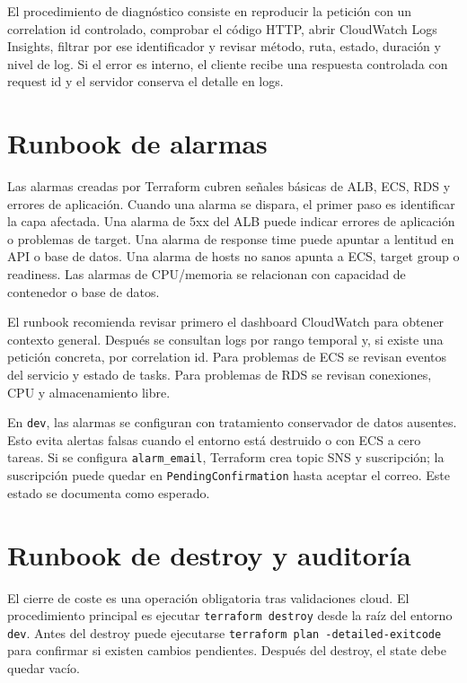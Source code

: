 El procedimiento de diagnóstico consiste en reproducir la petición con un correlation id controlado, comprobar el código HTTP, abrir CloudWatch Logs Insights, filtrar por ese identificador y revisar método, ruta, estado, duración y nivel de log. Si el error es interno, el cliente recibe una respuesta controlada con request id y el servidor conserva el detalle en logs.

\section{Runbook de alarmas}
\label{sec:runbook-alarmas}

Las alarmas creadas por Terraform cubren señales básicas de ALB, ECS, RDS y errores de aplicación. Cuando una alarma se dispara, el primer paso es identificar la capa afectada. Una alarma de 5xx del ALB puede indicar errores de aplicación o problemas de target. Una alarma de response time puede apuntar a lentitud en API o base de datos. Una alarma de hosts no sanos apunta a ECS, target group o readiness. Las alarmas de CPU/memoria se relacionan con capacidad de contenedor o base de datos.

El runbook recomienda revisar primero el dashboard CloudWatch para obtener contexto general. Después se consultan logs por rango temporal y, si existe una petición concreta, por correlation id. Para problemas de ECS se revisan eventos del servicio y estado de tasks. Para problemas de RDS se revisan conexiones, CPU y almacenamiento libre.

En \texttt{dev}, las alarmas se configuran con tratamiento conservador de datos ausentes. Esto evita alertas falsas cuando el entorno está destruido o con ECS a cero tareas. Si se configura \texttt{alarm\_email}, Terraform crea topic SNS y suscripción; la suscripción puede quedar en \texttt{PendingConfirmation} hasta aceptar el correo. Este estado se documenta como esperado.

\section{Runbook de destroy y auditoría}
\label{sec:runbook-destroy}

El cierre de coste es una operación obligatoria tras validaciones cloud. El procedimiento principal es ejecutar \texttt{terraform destroy} desde la raíz del entorno \texttt{dev}. Antes del destroy puede ejecutarse \texttt{terraform plan -detailed-exitcode} para confirmar si existen cambios pendientes. Después del destroy, el state debe quedar vacío.

